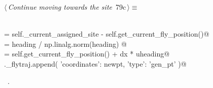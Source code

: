 \documentclass[11.5pt]{report}
\begin{document}
\vspace{-0.8cm} \newchunk {}
\begin{flushleft} \small
\begin{minipage}{\linewidth}\label{scrap122}\raggedright\small
{} $\langle\,${\itshape Continue moving towards the site}\nobreak\ {\footnotesize {79c}}$\,\rangle\equiv$
\vspace{-1ex}
\begin{list}{}{} \item
\mbox{}\verb@@\\
\mbox{}\verb@heading  = self._current_assigned_site - self.get_current_fly_position()@\\
\mbox{}\verb@uheading = heading / np.linalg.norm(heading) @\\
\mbox{}\verb@newpt    = self.get_current_fly_position() + dx * uheading@\\
\mbox{}\verb@self._flytraj.append(  {'coordinates': newpt, 'type': 'gen_pt'}  )@\\
\mbox{}\verb@@{\NWsep}
\end{list}
\vspace{-1.5ex}
\footnotesize
\begin{list}{}{\setlength{\itemsep}{-\parsep}\setlength{\itemindent}{-\leftmargin}}
\item \NWtxtMacroRefIn\ .

\item{}
\end{list}
\end{minipage}\vspace{4ex}
\end{flushleft}
\end{document}
